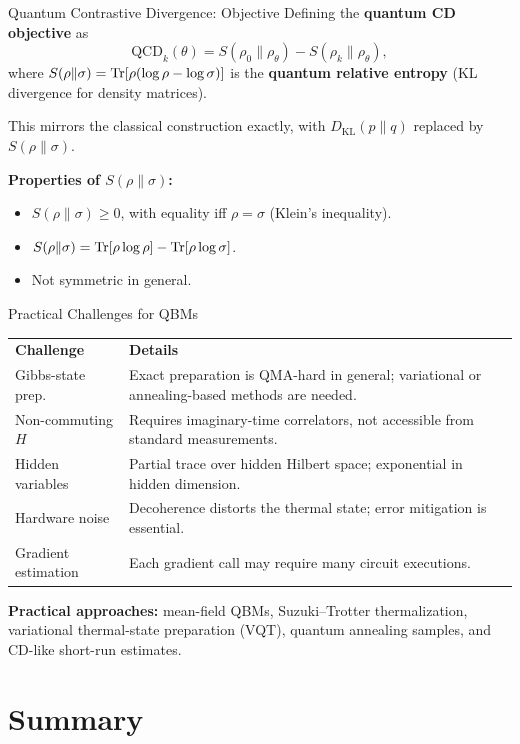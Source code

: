 \documentclass[aspectratio=169]{beamer}
\newcommand{\DKL}{D_{\mathrm{KL}}}
\begin{document}
\begin{frame}{Quantum Contrastive Divergence: Objective}
Defining the \textbf{quantum CD objective} as
\[
  \mathrm{QCD}_k(\theta)
  = S(\rho_0\|\rho_\theta)
    - S(\rho_k\|\rho_\theta),
\]
where $S(\rho\|\sigma) = \Tr[\rho(\log\rho - \log\sigma)]$ is the
\textbf{quantum relative entropy} (KL divergence for density matrices).

\medskip
This mirrors the classical construction exactly, with
$\DKL(p\|q)$ replaced by $S(\rho\|\sigma)$.

\medskip
\textbf{Properties of $S(\rho\|\sigma)$:}
\begin{itemize}
  \item $S(\rho\|\sigma)\ge 0$, with equality iff $\rho=\sigma$ (Klein's inequality).
  \item $S(\rho\|\sigma)=\Tr[\rho\log\rho]-\Tr[\rho\log\sigma]$.
  \item Not symmetric in general.
\end{itemize}
\end{frame}

\begin{frame}{Practical Challenges for QBMs}
\begin{tabular}{lp{8cm}}
  \textbf{Challenge} & \textbf{Details} \\[3pt]
  Gibbs-state prep.\ & Exact preparation is QMA-hard in general;
                        variational or annealing-based methods are needed. \\[3pt]
  Non-commuting $H$ & Requires imaginary-time correlators,
                       not accessible from standard measurements. \\[3pt]
  Hidden variables & Partial trace over hidden Hilbert space;
                     exponential in hidden dimension. \\[3pt]
  Hardware noise & Decoherence distorts the thermal state;
                    error mitigation is essential. \\[3pt]
  Gradient estimation & Each gradient call may require many circuit executions.
\end{tabular}

\medskip
\textbf{Practical approaches:}
mean-field QBMs, Suzuki--Trotter thermalization,
variational thermal-state preparation (VQT),
quantum annealing samples,
and CD-like short-run estimates.
\end{frame}

\section{Summary}
\end{document}
